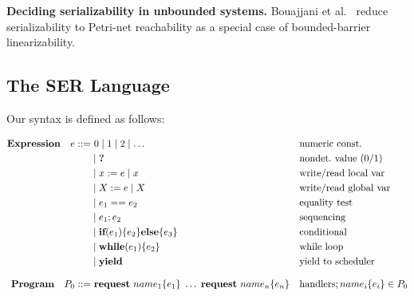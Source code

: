 \medskip
\noindent
\textbf{Deciding serializability in unbounded systems.}
Bouajjani et al.~\cite{BoEmEnHa13} reduce serializability to Petri-net reachability as a special case of bounded-barrier linearizability.


\subsection{The SER Language}
Our \toolname{} syntax is defined as follows: 

\[
\begin{aligned}
	\mathbf{Expression}\quad e ::= &\ 0 \mid 1 \mid 2 \mid \dots            && \text{numeric const.}\\
	&\mid \textbf{?}                            && \text{nondet.\ value (0/1)}\\
	&\mid x := e \mid x                      && \text{write/read local var}\\
	&\mid X := e \mid X                      && \text{write/read global var}\\
	&\mid e_1 == e_2                         && \text{equality test}\\
	&\mid e_1 ; e_2                          && \text{sequencing}\\
	&\mid \textbf{if}(e_1)\{e_2\}\textbf{else}\{e_3\}    && \text{conditional}\\
	&\mid \textbf{while}(e_1)\{e_2\}               && \text{while loop}\\
	&\mid \textbf{yield}                           && \text{yield to scheduler}
	\\[0.8em]
	\mathbf{Program}\quad P_0 ::= &\ \textbf{request}\ name_1\{e_1\}\;\dots\;\textbf{request}\ name_n\{e_n\}
	&& \text{handlers}; name_i\{e_i\}\in P_0
\end{aligned}
\]

